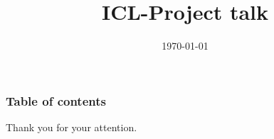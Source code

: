 \documentclass{beamer}
\begin{document}
\title{ICL-Project talk}
\date{\today}

\begin{frame}
  \titlepage
\end{frame}

\begin{frame}
  \frametitle{Table of contents}
  \tableofcontents[hideallsubsections] 
\end{frame}


\begin{frame}
\begin{center}
\LARGE
  Thank you for your attention.
\end{center}
\end{frame}
\end{document}
